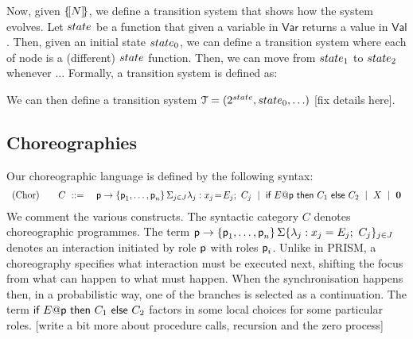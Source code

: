 Now, given $\{\![N]\!\}$, we define a transition system that shows how the
system evolves.  Let $\state$ be a function that given a variable in
$\mathsf{Var}$ returns a value in $\mathsf{Val}$. Then, given an
initial state $\state_0$, we can define a transition system where each
of node is a (different) $\state$ function. Then, we can move from
$\state_1$ to $\state_2$ whenever ... Formally, a transition system is
defined as:
\begin{definition}
\end{definition}
We can then define a transition system
$\mathcal T = (2^\state,\state_0,\ldots)$ [fix details here].






\newpage


\subsection{Choreographies}

 Our choreographic language is defined by the following
syntax:
%
\begin{displaymath}
  \begin{array}{lll}
    \text{(Chor)}
    \quad & C \ ::=\
    &
      \textsf{p}\rightarrow \{\textsf{p}_1,\ldots,\textsf{p}_n\}\,\Sigma_{j\in J} \lambda_j: x_j\!=\!E_j;\ C_j
      \ \mid\
      \textsf{if } E@\textsf{p} \textsf{ then } {C_1} \textsf{ else } {C_2}
      \ \mid\
      X
      \ \mid\
      \mathbf{0}
  \end{array}
\end{displaymath}
We comment the various constructs. The syntactic category $C$ denotes
choreographic programmes. The term
$\textsf{p}\rightarrow \{\textsf{p}_1,\ldots,\textsf{p}_n\}\,\Sigma\{\lambda_j:
x_j=E_j;\ C_j\}_{j\in J}$ denotes an interaction initiated by role
$\textsf{p}$ with roles $\textsf{p}_i$. Unlike in PRISM, a choreography
specifies what interaction must be executed next, shifting the focus
from what can happen to what must happen. When the synchronisation
happens then, in a probabilistic way, one of the branches is selected
as a continuation. The term
$\textsf{if } E@\textsf{p} \textsf{ then } C_1 \textsf{
  else } C_2$ factors in some local choices for some particular
roles. [write a bit more about procedure calls, recursion and the zero
process]

